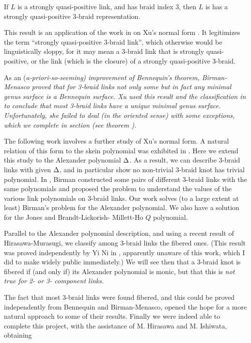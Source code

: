 \begin{theorem}\label{thqp}
If $L$ is a strongly quasi-positive link, and has braid index 3,
then $L$ is has a strongly quasi-positive 3-braid representation.
\end{theorem}

This result is an application of the work in \cite{3br} on
Xu's normal form \cite{Xu}. It legitimizes the term ``strongly
quasi-positive 3-braid link'', which otherwise would be
linguistically sloppy, for it may mean a 3-braid link that is strongly
quasi-positive, or the link (which is the closure) of a strongly
quasi-positive 3-braid.


As an (\em{a-priori}-so-seeming) improvement of Bennequin's
theorem, Birman-Menasco proved \cite{BirMen2} that
for 3-braid links not only some but in fact \em{any} minimal genus
surface is a Bennequin surface. Xu used this result and the
classification in \cite{BirMen} to conclude that most 3-braid links
have a unique minimal genus surface. Unfortunately, she failed to
deal (in the oriented sense) with some exceptions, which we complete
in section  (see theorem ).

The following work involves a further study of Xu's normal form.
%
A natural relation of this form to the skein polynomial was
exhibited in \cite{3br}. Here we extend this study to the Alexander
polynomial $\Delta$. As a result, we can describe 3-braid links with
given $\Delta$, and in particular show no non-trivial 3-braid
knot has trivial polynomial. In \cite{Birman}, Birman constructed
some pairs of different 3-braid links with the same polynomials
and proposed the problem to understand the values of the various
link polynomials on 3-braid links. Our work solves (to a large
extent at least) Birman's problem for the Alexander polynomial.
We also have a solution for the Jones and Brandt-Lickorish-%
Millett-Ho $Q$ polynomial. 

Parallel to the Alexander polynomial description, and using
a recent result of Hirasawa-Murasugi, we classify among 3-braid
links the fibered ones. (This result was proved independently
by Yi Ni in \cite{Ni}, apparently unaware of this work, which
I did to make widely public immediately.) We will see then
that a 3-braid knot is fibered if (and only if) its Alexander
polynomial is monic, but that this is \em{not} true for 2- or
3- component links.

The fact that most 3-braid links were found fibered,
and this could be proved independently from Bennequin and
Birman-Menasco, opened the hope for a more natural approach to
some of their results. Finally we were indeed able to complete this
project, with the assistance of M. Hirasawa and M. Ishiwata, obtaining

